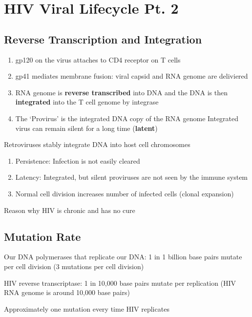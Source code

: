 \documentclass{notes}
\begin{document}
\section{HIV Viral Lifecycle Pt. 2}

\subsection{Reverse Transcription and Integration}

\begin{enumerate}
    \item gp120 on the virus attaches to CD4 receptor on T cells
    \item gp41 mediates membrane fusion: viral capsid and RNA genome are deliviered
    \item RNA genome is \textbf{reverse transcribed} into DNA and the DNA is then \textbf{integrated} into the T cell genome by integrase
    \item The `Provirus' is the integrated DNA copy of the RNA genome
    \subitem Integrated virus can remain silent for a long time (\textbf{latent})
\end{enumerate}

Retroviruses stably integrate DNA into host cell chromosomes

\begin{enumerate}
    \item Persistence: Infection is not easily cleared
    \item Latency: Integrated, but silent proviruses are not seen by the immune system
    \item Normal cell division increases number of infected cells (clonal expansion)
\end{enumerate}

\tab \indicates Reason why HIV is chronic and has no cure

\subsection{Mutation Rate}

Our DNA polymerases that replicate our DNA: 1 in 1 billion base pairs mutate per cell division (3 mutations per cell division)

HIV reverse transcriptase: 1 in 10,000 base pairs mutate per replication (HIV RNA genome is around 10,000 base pairs)

\tab Approximately one mutation every time HIV replicates
\end{document}
